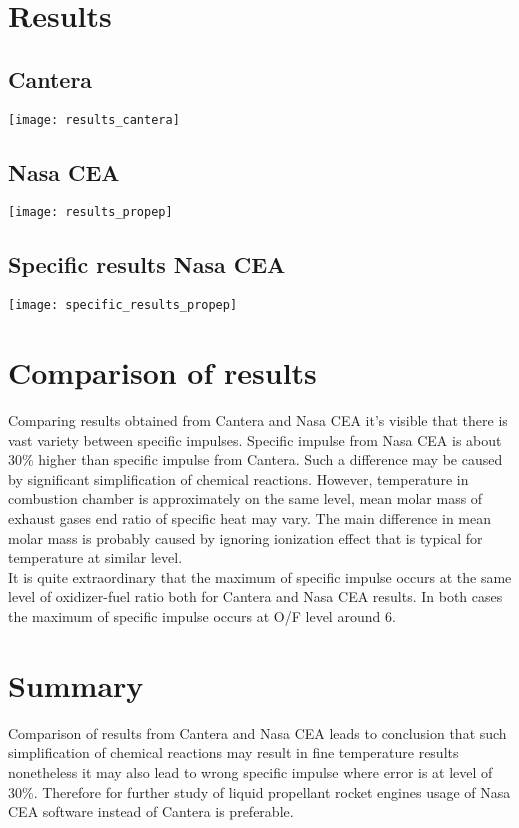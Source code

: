 \documentclass[11pt]{article}
\begin{document}
\section{Results}
\subsection{Cantera}
\begin{center}
\texttt{[image: results\_cantera]}
\end{center}
\subsection{Nasa CEA}
\begin{center}
\texttt{[image: results\_propep]}
\end{center}
\subsection{Specific results Nasa CEA}
\begin{center}
\texttt{[image: specific\_results\_propep]}
\end{center}
\section{Comparison of results}
Comparing results obtained from Cantera and Nasa CEA it's visible that there is vast variety between specific impulses. Specific impulse from Nasa CEA is about 30\% higher than specific impulse from Cantera. Such a difference may be caused by significant simplification of chemical reactions. However, temperature in combustion chamber is approximately on the same level, mean molar mass of exhaust gases end ratio of specific heat may vary. The main difference in mean molar mass is probably caused by ignoring ionization effect that is typical for temperature at similar level.  \\
It is quite extraordinary that the maximum of specific impulse occurs at the same level of oxidizer-fuel ratio both for Cantera and Nasa CEA results. In both cases the maximum of specific impulse occurs at O/F level around 6.
\section{Summary}
Comparison of results from Cantera and Nasa CEA leads to conclusion that such simplification of chemical reactions may result in fine temperature results nonetheless it may also lead to wrong specific impulse where error is at level of 30\%. Therefore for further study of liquid propellant rocket engines usage of Nasa CEA software instead of Cantera is preferable.\\
\end{document}
